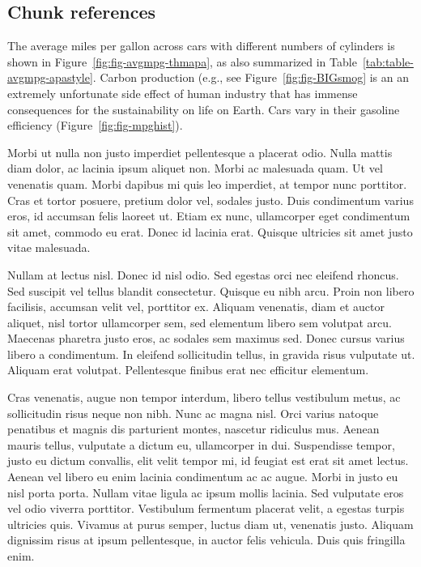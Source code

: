 \documentclass[
  english,
  man,floatsintext]{apa6}
\begin{document}
\hypertarget{chunk-references}{%
\subsection{Chunk references}\label{chunk-references}}

The average miles per gallon across cars with different numbers of cylinders is shown in Figure~\ref{fig:fig-avgmpg-thmapa}, as also summarized in Table~\ref{tab:table-avgmpg-apastyle}. Carbon production (e.g., see Figure~\ref{fig:fig-BIGsmog} is an an extremely unfortunate side effect of human industry that has immense consequences for the sustainability on life on Earth. Cars vary in their gasoline efficiency (Figure~\ref{fig:fig-mpghist}).

Morbi ut nulla non justo imperdiet pellentesque a placerat odio. Nulla mattis diam dolor, ac lacinia ipsum aliquet non. Morbi ac malesuada quam. Ut vel venenatis quam. Morbi dapibus mi quis leo imperdiet, at tempor nunc porttitor. Cras et tortor posuere, pretium dolor vel, sodales justo. Duis condimentum varius eros, id accumsan felis laoreet ut. Etiam ex nunc, ullamcorper eget condimentum sit amet, commodo eu erat. Donec id lacinia erat. Quisque ultricies sit amet justo vitae malesuada.

Nullam at lectus nisl. Donec id nisl odio. Sed egestas orci nec eleifend rhoncus. Sed suscipit vel tellus blandit consectetur. Quisque eu nibh arcu. Proin non libero facilisis, accumsan velit vel, porttitor ex. Aliquam venenatis, diam et auctor aliquet, nisl tortor ullamcorper sem, sed elementum libero sem volutpat arcu. Maecenas pharetra justo eros, ac sodales sem maximus sed. Donec cursus varius libero a condimentum. In eleifend sollicitudin tellus, in gravida risus vulputate ut. Aliquam erat volutpat. Pellentesque finibus erat nec efficitur elementum.

Cras venenatis, augue non tempor interdum, libero tellus vestibulum metus, ac sollicitudin risus neque non nibh. Nunc ac magna nisl. Orci varius natoque penatibus et magnis dis parturient montes, nascetur ridiculus mus. Aenean mauris tellus, vulputate a dictum eu, ullamcorper in dui. Suspendisse tempor, justo eu dictum convallis, elit velit tempor mi, id feugiat est erat sit amet lectus. Aenean vel libero eu enim lacinia condimentum ac ac augue. Morbi in justo eu nisl porta porta. Nullam vitae ligula ac ipsum mollis lacinia. Sed vulputate eros vel odio viverra porttitor. Vestibulum fermentum placerat velit, a egestas turpis ultricies quis. Vivamus at purus semper, luctus diam ut, venenatis justo. Aliquam dignissim risus at ipsum pellentesque, in auctor felis vehicula. Duis quis fringilla enim.
\end{document}
